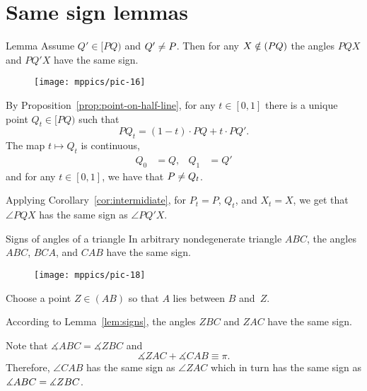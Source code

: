\section{Same sign lemmas}



\begin{thm}[\abs]{Lemma}\label{lem:signs}
Assume $Q'\in [PQ)$ and $Q'\ne P$.
Then for any $X\notin (PQ)$ the angles $PQX$ and $PQ'X$ have the same sign. 
\end{thm}

{

\begin{wrapfigure}{o}{33mm}
\centering
\vskip-5mm
\texttt{[image: mppics/pic-16]}
\end{wrapfigure}

By Proposition~\ref{prop:point-on-half-line},
for any $t\in [0,1]$ there is a unique point $Q_t\in[PQ)$ 
such that 
\[PQ_t=  (1-t)\cdot PQ+t\cdot PQ'.\]
The map $t\mapsto Q_t$ is continuous,
\begin{align*}
Q_0&=Q,
&
Q_1&=Q'
\end{align*}
and for any $t\in [0,1]$, 
we have that $P\ne Q_t$.

}

Applying Corollary~\ref{cor:intermidiate},
for $P_t=P$, $Q_t$, and $X_t=X$, we get that $\angle PQX$ has the same sign as $\angle PQ'X$.
\qeds



\begin{thm}[\abs]{Signs of angles of a triangle}\label{thm:signs-of-triug}
In arbitrary nondegenerate triangle $ABC$,
the angles $ABC$, $BCA$, and $CAB$ have the same sign. 
\end{thm}

{

\begin{wrapfigure}{o}{33mm}
\vskip-4mm
\centering
\texttt{[image: mppics/pic-18]}
\end{wrapfigure}

Choose a point $Z\in (AB)$ so that $A$ lies between $B$ and~$Z$.


According to Lemma~\ref{lem:signs},
the angles $ZBC$ and $ZAC$ have the same sign.


Note that $\measuredangle ABC=\measuredangle ZBC$
and 
$$\measuredangle ZAC+\measuredangle CAB\equiv \pi.$$
Therefore, $\angle CAB$ has the same sign as $\angle ZAC$
which in turn has the same sign as $\measuredangle ABC=\measuredangle ZBC$.

}

